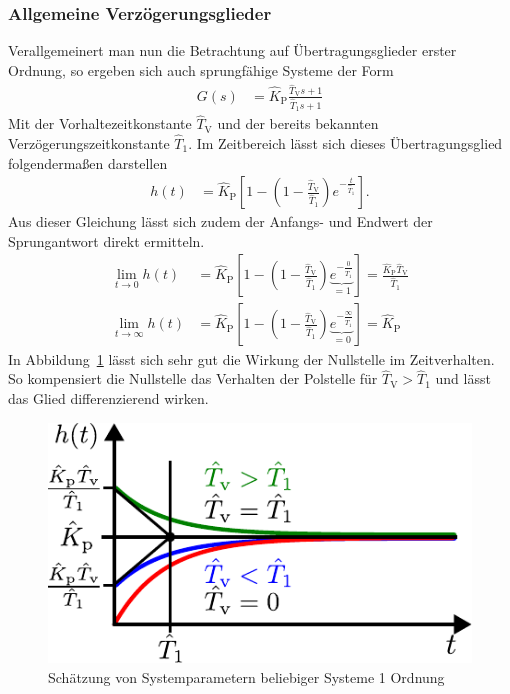 \subsubsection{Allgemeine Verzögerungsglieder}
%
Verallgemeinert man nun die Betrachtung auf Übertragungsglieder erster Ordnung, so ergeben sich auch sprungfähige Systeme der Form
%
\begin{equation*}
\begin{aligned}
%
G(s)&=\hat{K}_{\text{P}}\frac{\hat{T}_{\text{V}}s+1}{\hat{T}_{1}s+1}%
%
\end{aligned}
\end{equation*}
%
Mit der Vorhaltezeitkonstante $\hat{T}_{\text{V}}$ und der bereits bekannten Verzögerungszeitkonstante $\hat{T}_{\text{1}}$. Im Zeitbereich lässt sich dieses Übertragungsglied folgendermaßen darstellen
%
\begin{equation*}
\begin{aligned}
%
h(t)&=\hat{K}_{\text{P}}\left[1-\left(1-\frac{\hat{T}_{\text{V}}}{\hat{T}_{\text{1}}}\right)e^{-\frac{t}{\hat{T}_{1}}}\right].
%
\end{aligned}
\end{equation*}
%
Aus dieser Gleichung lässt sich zudem der Anfangs- und Endwert der Sprungantwort direkt ermitteln.
%
\begin{equation*}
\begin{aligned}
%
\lim\limits_{t\rightarrow 0}h(t)&=\hat{K}_{\text{P}}\left[1-\left(1-\frac{\hat{T}_{\text{V}}}{\hat{T}_{\text{1}}}\right)\underbrace{e^{-\frac{0}{\hat{T}_{1}}}}_{=1}\right] = \frac{\hat{K}_{\text{P}}\hat{T}_{\text{V}}}{\hat{T}_{1}}\\	
%
\lim\limits_{t\rightarrow \infty}h(t)&=\hat{K}_{\text{P}}\left[1-\left(1-\frac{\hat{T}_{\text{V}}}{\hat{T}_{\text{1}}}\right)\underbrace{e^{-\frac{\infty}{\hat{T}_{1}}}}_{=0}\right] = \hat{K}_{\text{P}}
%
\end{aligned}
\end{equation*}
%
In Abbildung~\ref{fig:experimallpass} lässt sich sehr gut die Wirkung der Nullstelle im Zeitverhalten. So kompensiert die Nullstelle das Verhalten der Polstelle für $\hat{T}_{\text{V}}>\hat{T}_{1}$ und lässt das Glied differenzierend wirken.
%
\begin{figure}[h]
	\centering
	\includegraphics[width=0.5\linewidth]{Abbildungen/Modellbildung/PDF/ExperimentelAllpass.pdf}
	\caption{Schätzung von Systemparametern beliebiger Systeme 1 Ordnung \cite{Foellinger94}}
	\label{fig:experimallpass}
\end{figure}
